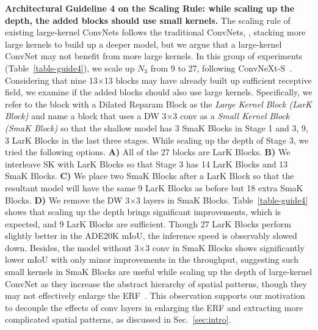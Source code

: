 \documentclass[10pt,twocolumn,letterpaper]{article}
\begin{document}
\noindent\textbf{Architectural Guideline 4 on the Scaling Rule: while scaling up the depth, the added blocks should use small kernels.} The scaling rule of existing large-kernel ConvNets follows the traditional ConvNets, \ie, stacking more large kernels to build up a deeper model, but we argue that a large-kernel ConvNet may not benefit from more large kernels. In this group of experiments (Table~\ref{table-guide4}), we scale up $N_3$ from 9 to 27, following ConvNeXt-S~\cite{liu2022convnet}. Considering that nine 13$\times$13 blocks may have already built up sufficient receptive field, we examine if the added blocks should also use large kernels. Specifically, we refer to the block with a Dilated Reparam Block as the \emph{Large Kernel Block (LarK Block)} and name a block that uses a DW 3$\times$3 conv as a \emph{Small Kernel Block (SmaK Block)} so that the shallow model has 3 SmaK Blocks in Stage 1 and 3, 9, 3 LarK Blocks in the last three stages. While scaling up the depth of Stage 3, we tried the following options. \textbf{A)} All of the 27 blocks are LarK Blocks. \textbf{B)} We interleave SK with LarK Blocks so that Stage 3 has 14 LarK Blocks and 13 SmaK Blocks. \textbf{C)} We place two SmaK Blocks after a LarK Block so that the resultant model will have the same 9 LarK Blocks as before but 18 extra SmaK Blocks. \textbf{D)} We remove the DW 3$\times$3 layers in SmaK Blocks. Table~\ref{table-guide4} shows that scaling up the depth brings significant improvements, which is expected, and 9 LarK Blocks are sufficient. Though 27 LarK Blocks perform slightly better in the ADE20K mIoU, the inference speed is observably slowed down. Besides, the model without 3$\times$3 conv in SmaK Blocks shows significantly lower mIoU with only minor improvements in the throughput, suggesting such small kernels in SmaK Blocks are useful while scaling up the depth of large-kernel ConvNet as they increase the abstract hierarchy of spatial patterns, though they may not effectively enlarge the ERF~\cite{ding2022scaling,erf}. This observation supports our motivation to decouple the effects of conv layers in enlarging the ERF and extracting more complicated spatial patterns, as discussed in Sec.~\ref{sec:intro}. 
\end{document}

